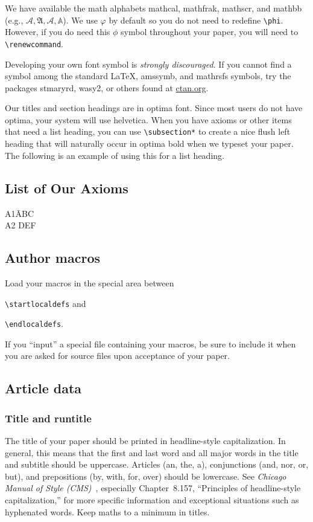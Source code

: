 \documentclass{ndjflart}
\theoremstyle{definition}
\theoremstyle{remark}
\newcommand{\origphi}{\phi}
\newcommand{\mn}{\medskip\noindent}
\begin{document}
We have available the math alphabets mathcal, mathfrak, mathscr, and
mathbb (e.g., $\mathcal{A}, \mathfrak{A}, \mathscr{A}, \mathbb{A}$).
We use $\varphi$ by default so you do not need to redefine
\verb=\phi=.  However, if you do need this $\origphi$ symbol
throughout your paper, you will need to \verb=\renewcommand=.

Developing your own font symbol is \emph{strongly discouraged}.  If
you cannot find a symbol among the standard \LaTeX, amssymb, and
mathrsfs symbols, try the packages stmaryrd, wasy2, or others found at
\href{http://www.ctan.org}{ctan.org}.

Our titles and section headings are in optima font.  Since most users
do not have optima, your system will use helvetica.  When you have
axioms or other items that need a list heading, you can use
\verb=\subsection*= to create a nice flush left heading that will
naturally occur in optima bold when we typeset your paper.  The
following is an example of using this for a list heading.

\subsection*{List of Our Axioms}

\begin{tabbing}
  A1\quad \= ABC\\
  A2\> DEF
\end{tabbing} 

\subsection{Author macros}\label{macros} Load your macros in the
special area between

\mn \verb=\startlocaldefs= and

\mn \verb=\endlocaldefs=.

\mn If you ``input'' a special file containing your macros, be sure to
include it when you are asked for source files upon acceptance of your
paper.

\subsection{Article data}

\subsubsection{Title and runtitle}\label{tandr} The title of your paper should be
printed in headline-style capitalization. In general, this means that
the first and last word and all major words in the title and subtitle
should be uppercase. Articles (an, the, a), conjunctions (and, nor,
or, but), and prepositions (by, with, for, over) should be lowercase.
See \emph{Chicago Manual of Style (CMS)}~\cite{CMS}, especially
Chapter~8.157, ``Principles of headline-style capitalization,'' for
more specific information and exceptional situations such as
hyphenated words.  Keep maths to a minimum in titles.
\end{document}
